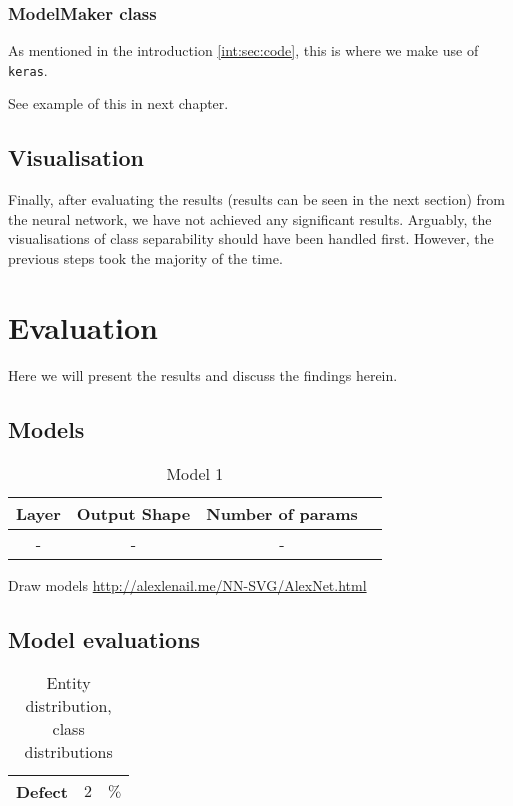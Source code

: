 \subsection{ModelMaker class}
As mentioned in the introduction \ref{int:sec:code}, this is where we make use of \verb|keras|.

See example of this in next chapter. 

\section{Visualisation}
Finally, after evaluating the results (results can be seen in the next section) from the neural network, we have not achieved any significant results. Arguably, the visualisations of class separability should have been handled first. However, the previous steps took the majority of the time.

\chapter{Evaluation}
Here we will present the results and discuss the findings herein.


\section{Models}
\begin{table}[H]
	\centering
	\begin{tabular}{|c|c|c| c|} \hline
		\textbf{Layer} & \textbf{Output Shape } & \textbf{Number of params} \\ \hline \hline 
		- & - &  -  \\ \hline 
	\end{tabular}
	\caption{Model 1}
	\label{datasets}
\end{table}

Draw models \url{http://alexlenail.me/NN-SVG/AlexNet.html} 

\section{Model evaluations}

\begin{table}[H]
	\centering
	\begin{tabular}{|c|c|c|} \hline
		\textbf{Defect} & $2$ & $ \%$\\ \hline
	\end{tabular}
	\caption{Entity distribution, class distributions}
\end{table}

